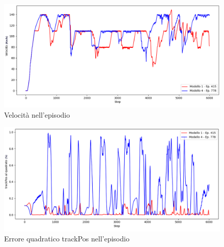 \begin{figure}[hb]
    \centering
    \includegraphics[width = 5.5in]{Figures/Chapter5/model_1-4_velocity.png}
    \caption{Velocità nell'episodio}
    \label{fig:model_1-4_velocity}
\end{figure}

\begin{figure}[hb]
    \centering
    \includegraphics[width = 5.5in]{Figures/Chapter5/model_1-4_trackpos.png}
    \caption{Errore quadratico trackPos nell'episodio}
    \label{fig:model_1-4_trackpos}
\end{figure}